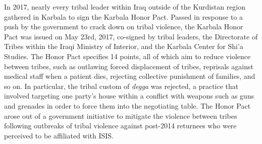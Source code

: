 





In 2017, nearly every tribal leader within Iraq outside of the Kurdistan region gathered in Karbala to sign the Karbala Honor Pact. Passed in response to a push by the government to crack down on tribal violence, the Karbala Honor Pact was issued on May 23rd, 2017, co-signed by tribal leaders, the Directorate of Tribes within the Iraqi Ministry of Interior, and the Karbala Center for Shi'a Studies. The Honor Pact specifies 14 points, all of which aim to reduce violence between tribes, such as outlawing forced displacement of tribes, reprisals against medical staff when a patient dies, rejecting collective punishment of families, and so on. In particular, the tribal custom of \emph{degga} was rejected, a practice that involved targeting one party's house within a conflict with weapons such as guns and grenades in order to force them into the negotiating table. The Honor Pact arose out of a government initiative to mitigate the violence between tribes following outbreaks of tribal violence against post-2014 returnees who were perceived to be affiliated with ISIS.

